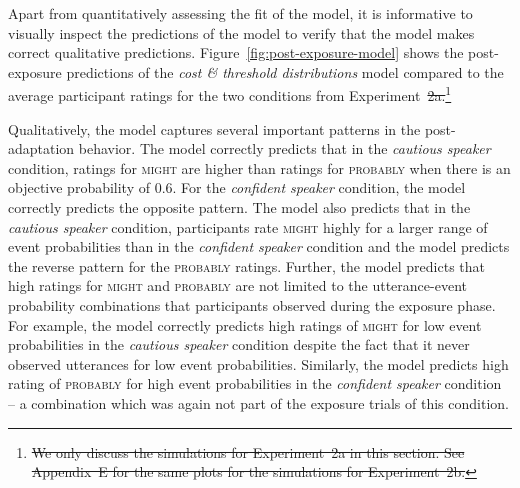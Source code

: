 \documentclass[man, floatsintext]{apa6}
\providecommand{\DIFadd}[1]{{\protect\color{blue}\uwave{#1}}} %
\providecommand{\DIFdel}[1]{{\protect\color{red}\sout{#1}}}                      %
\providecommand{\DIFaddbegin}{} %
\providecommand{\DIFaddend}{} %
\providecommand{\DIFdelbegin}{} %
\providecommand{\DIFdelend}{} %
\newcommand{\DIFscaledelfig}{0.5}
\newlength{\DIFdelgraphicswidth} %
\newlength{\DIFdelgraphicsheight} %
\newcommand{\DIFaddincludegraphics}[2][]{{\color{blue}\fbox{\DIFOincludegraphics[#1]{#2}}}} %
\newcommand{\DIFdelincludegraphics}[2][]{%
\sbox{\DIFdelgraphicsbox}{\DIFOincludegraphics[#1]{#2}}%
\settoboxwidth{\DIFdelgraphicswidth}{\DIFdelgraphicsbox} %
\settoboxtotalheight{\DIFdelgraphicsheight}{\DIFdelgraphicsbox} %
\scalebox{\DIFscaledelfig}{%
\parbox[b]{\DIFdelgraphicswidth}{\usebox{\DIFdelgraphicsbox}\\[-\baselineskip] \rule{\DIFdelgraphicswidth}{0em}}\llap{\resizebox{\DIFdelgraphicswidth}{\DIFdelgraphicsheight}{%
\setlength{\unitlength}{\DIFdelgraphicswidth}%
\begin{picture}(1,1)%
\thicklines\linethickness{2pt} %
{\color[rgb]{1,0,0}\put(0,0){\framebox(1,1){}}}%
{\color[rgb]{1,0,0}\put(0,0){\line( 1,1){1}}}%
{\color[rgb]{1,0,0}\put(0,1){\line(1,-1){1}}}%
\end{picture}%
}\hspace*{3pt}}} %
} %
\DeclareRobustCommand{\DIFaddbegin}{\DIFOaddbegin \let\includegraphics\DIFaddincludegraphics} %
\DeclareRobustCommand{\DIFaddend}{\DIFOaddend \let\includegraphics\DIFOincludegraphics} %
\DeclareRobustCommand{\DIFdelbegin}{\DIFOdelbegin \let\includegraphics\DIFdelincludegraphics} %
\DeclareRobustCommand{\DIFdelend}{\DIFOaddend \let\includegraphics\DIFOincludegraphics} %
\begin{document}
Apart from quantitatively assessing the fit of the model, it is informative to visually inspect the predictions of the model to verify that the model makes correct qualitative predictions. 
Figure~\ref{fig:post-exposure-model} shows the post-exposure predictions of the \textit{cost \& threshold distributions} model compared to the average participant ratings for the two conditions from Experiment~\DIFdelbegin \DIFdel{2a.}\footnote{\DIFdel{We only discuss the simulations for Experiment~2a in this section. See Appendix~E for the same plots for the simulations for Experiment~2b.}} %
\addtocounter{footnote}{-1}%
\DIFdelend \DIFaddbegin \DIFadd{2.
}\DIFaddend Qualitatively, 
the model captures several important patterns in the post-adaptation behavior. The model correctly predicts that in the \textit{cautious speaker} condition, ratings for \textsc{might} are 
higher than ratings for \textsc{probably} when there is an objective probability of 0.6. For the \textit{confident speaker} condition, the model correctly predicts the
opposite pattern. The model also predicts that in the \textit{cautious speaker} condition, participants rate \textsc{might} highly for a larger range of event probabilities than
in the \textit{confident speaker} condition and the model predicts the  reverse pattern for the \textsc{probably} ratings. Further, the model predicts that high ratings for \textsc{might} 
and \textsc{probably} are not limited to the utterance-event probability combinations that participants observed during the exposure phase. For example, the model correctly predicts
high ratings of \textsc{might} for low event probabilities in the \textit{cautious speaker} condition despite the fact that it never observed utterances for low event probabilities. Similarly,
the model predicts high rating of \textsc{probably} for high event probabilities in the \textit{confident speaker} condition -- a combination which was again not part of the exposure trials
of this condition.
\end{document}

